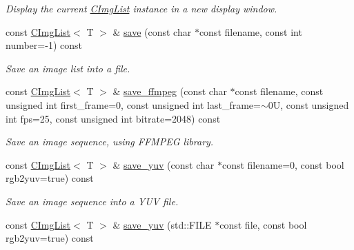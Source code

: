 \begin{DoxyCompactItemize}
\begin{DoxyCompactList}\small\item\em Display the current \hyperlink{structcimg__library_1_1CImgList}{CImgList} instance in a new display window. \item\end{DoxyCompactList}\item 
const \hyperlink{structcimg__library_1_1CImgList}{CImgList}$<$ T $>$ \& \hyperlink{structcimg__library_1_1CImgList_a814fe09c21090e7673d96c6145fc64bf}{save} (const char $\ast$const filename, const int number=-\/1) const 
\begin{DoxyCompactList}\small\item\em Save an image list into a file. \item\end{DoxyCompactList}\item 
\hypertarget{structcimg__library_1_1CImgList_af89a53375d81d5967d89cc1a02b584da}{
const \hyperlink{structcimg__library_1_1CImgList}{CImgList}$<$ T $>$ \& \hyperlink{structcimg__library_1_1CImgList_af89a53375d81d5967d89cc1a02b584da}{save\_\-ffmpeg} (const char $\ast$const filename, const unsigned int first\_\-frame=0, const unsigned int last\_\-frame=$\sim$0U, const unsigned int fps=25, const unsigned int bitrate=2048) const }
\label{structcimg__library_1_1CImgList_af89a53375d81d5967d89cc1a02b584da}

\begin{DoxyCompactList}\small\item\em Save an image sequence, using FFMPEG library. \item\end{DoxyCompactList}\item 
\hypertarget{structcimg__library_1_1CImgList_a09200f3c4abcfa6572ff2686731c87b7}{
const \hyperlink{structcimg__library_1_1CImgList}{CImgList}$<$ T $>$ \& \hyperlink{structcimg__library_1_1CImgList_a09200f3c4abcfa6572ff2686731c87b7}{save\_\-yuv} (const char $\ast$const filename=0, const bool rgb2yuv=true) const }
\label{structcimg__library_1_1CImgList_a09200f3c4abcfa6572ff2686731c87b7}

\begin{DoxyCompactList}\small\item\em Save an image sequence into a YUV file. \item\end{DoxyCompactList}\item 
\hypertarget{structcimg__library_1_1CImgList_aa49eac3ee2a1a76010d017bb6dbd0f0b}{
const \hyperlink{structcimg__library_1_1CImgList}{CImgList}$<$ T $>$ \& \hyperlink{structcimg__library_1_1CImgList_aa49eac3ee2a1a76010d017bb6dbd0f0b}{save\_\-yuv} (std::FILE $\ast$const file, const bool rgb2yuv=true) const }
\label{structcimg__library_1_1CImgList_aa49eac3ee2a1a76010d017bb6dbd0f0b}


\end{DoxyCompactItemize}
